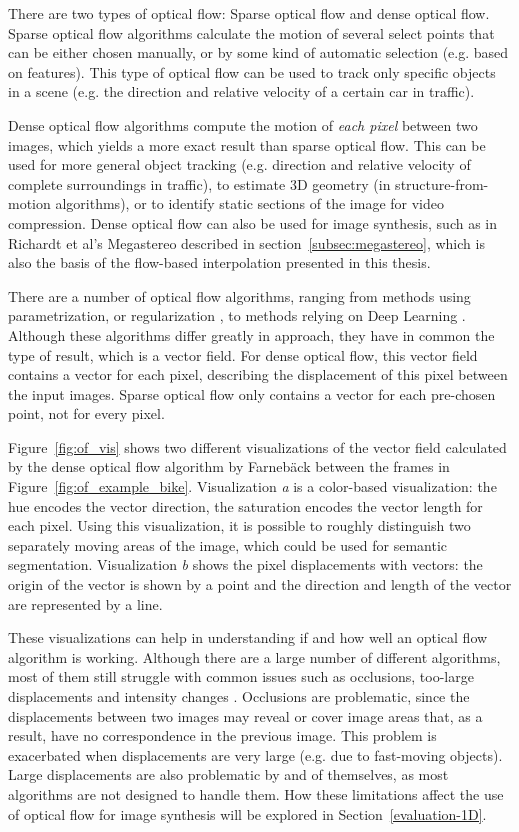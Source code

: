 There are two types of optical flow: Sparse optical flow and dense optical flow. Sparse optical flow algorithms calculate the motion of several select points that can be either chosen manually, or by some kind of automatic selection (e.g. based on features). This type of optical flow can be used to track only specific objects in a scene (e.g. the direction and relative velocity of a certain car in traffic).

Dense optical flow algorithms compute the motion of \emph{each pixel} between two images, which yields a more exact result than sparse optical flow. This can be used for more general object tracking (e.g. direction and relative velocity of complete surroundings in traffic), to estimate 3D geometry (in structure-from-motion algorithms), or to identify static sections of the image for video compression. Dense optical flow can also be used for image synthesis, such as in Richardt et al's Megastereo \cite{megastereo} described in section~\ref{subsec:megastereo}, which is also the basis of the flow-based interpolation presented in this thesis.

There are a number of optical flow algorithms, ranging from methods using parametrization, or regularization \cite{of-survey}, to methods relying on Deep Learning \cite{of-deep}. Although these algorithms differ greatly in approach, they have in common the type of result, which is a vector field. For dense optical flow, this vector field contains a vector for each pixel, describing the displacement of this pixel between the input images. Sparse optical flow only contains a vector for each pre-chosen point, not for every pixel.

Figure~\ref{fig:of_vis} shows two different visualizations of the vector field calculated by the dense optical flow algorithm by Farneb\"ack \cite{farneback} between the frames in Figure~\ref{fig:of_example_bike}. Visualization \emph{a} is a color-based visualization: the hue encodes the vector direction, the saturation encodes the vector length for each pixel. Using this visualization, it is possible to roughly distinguish two separately moving areas of the image, which could be used for semantic segmentation. Visualization \emph{b} shows the pixel displacements with vectors: the origin of the vector is shown by a point and the direction and length of the vector are represented by a line.

These visualizations can help in understanding if and how well an optical flow algorithm is working. Although there are a large number of different algorithms, most of them still struggle with common issues such as occlusions, too-large displacements and intensity changes \cite{of-survey}. Occlusions are problematic, since the displacements between two images may reveal or cover image areas that, as a result, have no correspondence in the previous image. This problem is exacerbated when displacements are very large (e.g. due to fast-moving objects). Large displacements are also problematic by and of themselves, as most algorithms are not designed to handle them. How these limitations affect the use of optical flow for image synthesis will be explored in Section~\ref{evaluation-1D}.

